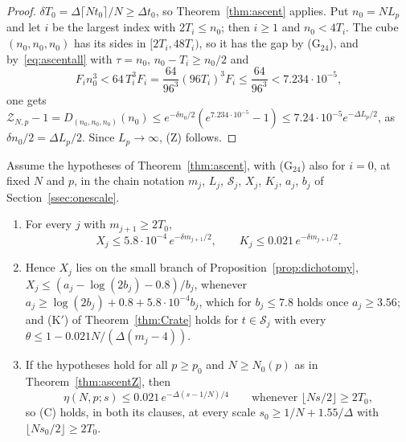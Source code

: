 \begin{proof}
$\delta T_0=\Delta\lceil Nt_0\rceil/N\ge\Delta t_0$, so Theorem~\ref{thm:ascent}
applies. Put $n_0=NL_p$ and let $i$ be the largest index with $2T_i\le n_0$;
then $i\ge1$ and $n_0<4T_i$. The cube $(n_0,n_0,n_0)$ has its sides in
$[2T_i,48T_i)$, so it has the gap by (G$_{24}$), and by~\eqref{eq:ascentall}
with $\tau=n_0$, $n_0-T_i\ge n_0/2$ and
\[
F_in_0^3<64\,T_i^3F_i=\frac{64}{96^3}(96T_i)^3F_i\le\frac{64}{96^3}<7.234
\cdot10^{-5},
\]
one gets $\mathcal Z_{N,p}-1=D_{(n_0,n_0,n_0)}(n_0)\le e^{-\delta n_0/2}
(e^{7.234\cdot10^{-5}}-1)\le7.24\cdot10^{-5}e^{-\Delta L_p/2}$, as $\delta
n_0/2=\Delta L_p/2$. Since $L_p\to\infty$, (Z) follows.
\end{proof}

\begin{corollary}\label{cor:branch}
Assume the hypotheses of Theorem~\ref{thm:ascent}, with \textup{(G$_{24}$)}
also for $i=0$, at fixed $N$ and $p$, in the chain notation $m_j$, $L_j$,
$\mathcal S_j$, $X_j$, $K_j$, $a_j$, $b_j$ of Section~\ref{ssec:onescale}.
\begin{enumerate}[label=\textup{(\roman*)},leftmargin=*]
\item For every $j$ with $m_{j+1}\ge2T_0$,
\[
X_j\le5.8\cdot10^{-4}\,e^{-\delta m_{j+1}/2},\qquad K_j\le0.021\,e^{-\delta
m_{j+1}/2}.
\]
\item Hence $X_j$ lies on the small branch of
Proposition~\ref{prop:dichotomy}, $X_j\le(a_j-\log(2b_j)-0.8)/b_j$, whenever
$a_j\ge\log(2b_j)+0.8+5.8\cdot10^{-4}b_j$, which for $b_j\le7.8$ holds once
$a_j\ge3.56$; and \textup{(K$'$)} of Theorem~\ref{thm:Crate} holds for $t\in
\mathcal S_j$ with every $\theta\le1-0.021N/(\Delta(m_j-4))$.
\item If the hypotheses hold for all $p\ge p_0$ and $N\ge N_0(p)$ as in
Theorem~\ref{thm:ascentZ}, then
\[
\eta(N,p;s)\le0.021\,e^{-\Delta(s-1/N)/4}\qquad\text{whenever }\lfloor Ns/2
\rfloor\ge2T_0,
\]
so \textup{(C)} holds, in both its clauses, at every scale $s_0\ge1/N+1.55/
\Delta$ with $\lfloor Ns_0/2\rfloor\ge2T_0$.
\end{enumerate}
\end{corollary}

